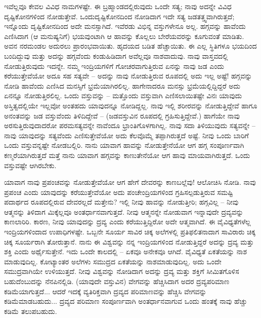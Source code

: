 ಇವೆಲ್ಲವೂ ಕೇವಲ ವಿವಿಧ ನಾಮಗಳಷ್ಟೇ. ಈ ಬ್ರಹ್ಮಾಂಡದಲ್ಲಿರುವುದು ಒಂದೇ ಸತ್ಯ; ನಾವು ಅದನ್ನೇ ವಿವಿಧ ದೃಷ್ಟಿಕೋನಗಳಿಂದ ನೋಡುತ್ತೇವೆ. ಒಂದು\break ದೃಷ್ಟಿಕೋನದಿಂದ ನೋಡಿದಾಗ ಇದೇ ಸತ್ಯ ಜಡತತ್ತ್ವವಾಗಿರುತ್ತದೆ; ಇನ್ನೊಂದು ದೃಷ್ಟಿಕೋನದಿಂದ ಅದೇ ಮನಸ್ಸಾಗಿದೆ. ಇವೆರಡು ವಿಭಿನ್ನ ವಸ್ತುಗಳೇನೂ ಅಲ್ಲ. ಹಗ್ಗವನ್ನು ಹಾವೆಂದು ಎಣಿಸಿದಾಗ (ಆ ಮನುಷ್ಯನಿಗೆ) ಭಯವುಂಟಾಗಿ ಆ ಹಾವನ್ನು ಕೊಲ್ಲಲು ಬೇರೆಯವರನ್ನು ಕೂಗುವಂತೆ ಮಾಡಿತು. ಅವನ ನರಮಂಡಲ ಅದುರಲು ಪ್ರಾರಂಭವಾಯಿತು. ಹೃದಯದ ಬಡಿತ ಹೆಚ್ಚಾಯಿತು. ಈ ಎಲ್ಲ ಸ್ಥಿತಿಗಳೂ ಭಯದಿಂದ ಬಂದಿದ್ದುವು ಮತ್ತು ಅದನ್ನು ಹಗ್ಗವೆಂದು ಕಂಡುಹಿಡಿದಾಗ ಅವೆಲ್ಲವೂ ನಾಶವಾದುವು. ನಾವು ವಾಸ್ತವದಲ್ಲಿ ನೋಡುತ್ತಿರುವುದು ಇದನ್ನೇ. ನಮ್ಮ ಇಂದ್ರಿಯಗಳಿಗೆ ಗೋಚರವಾಗುತ್ತಿರುವ ಏನನ್ನು ನಾವು ಜಡ ಎಂದು ಕರೆಯುತ್ತೇವೆಯೋ ಅದೂ ಸಹ ಸತ್ಯವೇ – ಅದನ್ನು ನಾವು ನೋಡುತ್ತಿರುವ ರೂಪದಲ್ಲಿ ಅದು ಇಲ್ಲ ಅಷ್ಟೆ! ಹಗ್ಗವನ್ನು ನೋಡಿ ಹಾವೆಂದು ಎಣಿಸಿದ ಮನಸ್ಸಿಗೆ ಭ್ರಮೆಯಾಗಿರಲಿಲ್ಲ. ಹಾಗೇನಾದರೂ ಮನಸ್ಸು ಭ್ರಮೆಯಲ್ಲಿದ್ದಿದ್ದರೆ ಅದು ಏನನ್ನೂ ನೋಡುತ್ತಿರಲಿಲ್ಲ. ಒಂದು ವಸ್ತುವನ್ನು – ಮತ್ತೊಂದು ವಸ್ತುವಾಗಿ ಎಣಿಸಲಾಯಿತಷ್ಟೇ ವಿನಃ ಯಾವುದು ಅಸ್ತಿತ್ವದಲ್ಲಿಯೇ ಇಲ್ಲವೋ ಅಂತಹದು ಯಾವುದನ್ನೂ ನೋಡಿದ್ದಲ್ಲ. ನಾವು ಇಲ್ಲಿ ಶರೀರವನ್ನು ನೋಡುತ್ತಿದ್ದೇವೆ ಹಾಗೂ ಅನಂತವನ್ನು ಜಡ ವಸ್ತುವೆಂದು ತಿಳಿದಿದ್ದೇವೆ – (ಜಡವಸ್ತುವಿನ ರೂಪದಲ್ಲಿ ಗ್ರಹಿಸುತ್ತಿದ್ದೇವೆ.) ಹಾಗೆಯೇ ನಾವು ಅರಸುತ್ತಿರುವುದಾದರೋ ಪರಮಸತ್ಯವನ್ನೇ ನಾವೆಂದೂ ಭ್ರಾಂತಿಗೊಳಗಾಗಿಲ್ಲ. ನಾವು ಸದಾ ತಿಳಿಯುವುದು ಸತ್ಯವನ್ನೇ – ನಾವು ಯಾವುದನ್ನು ಸತ್ಯವೆಂದು ಎಣಿಸುತ್ತೇವೆಯೋ ಅದು ಕೆಲವೊಮ್ಮೆ ತಪ್ಪಾಗಿರುತ್ತದೆ ಅಷ್ಟೆ. ನೀವು ಒಂದು ಬಾರಿಗೆ ಒಂದು ವಸ್ತುವನ್ನಷ್ಟೇ ನೋಡಬಲ್ಲಿರಿ. ನಾನು ಯಾವಾಗ ಹಾವನ್ನು ನೋಡುತ್ತೇನೆಯೋ ಆಗ ಹಗ್ಗ ಸಂಪೂರ್ಣವಾಗಿ ಕಣ್ಮರೆಯಾಗಿರುತ್ತದೆ ಮತ್ತೆ ನಾನು ಯಾವಾಗ ಹಗ್ಗವನ್ನು ಕಾಣುತೇನೆಯೋ ಆಗ ಹಾವು ಮಾಯವಾಗಿರುತ್ತದೆ. ಒಂದು ವಸ್ತುವಷ್ಟೇ ಆಗಿರಬೇಕು.

\vskip 1.5pt

ಯಾವಾಗ ನಾವು ಪ್ರಪಂಚವನ್ನು ನೋಡುತ್ತೇವೆಯೋ ಆಗ ಹೇಗೆ ದೇವರನ್ನು ಕಾಣಬಲ್ಲೆವು! ಆಲೋಚಿಸಿ ನೋಡಿ. ನಾವು ಪ್ರಪಂಚ ಎಂದು ಯಾವುದನ್ನು ಕರೆಯುತ್ತೇವೆಯೋ ಅದು ಪಂಚೇಂದ್ರಿಯಗಳಿಂದ ಗ್ರಹಿಸಲ್ಪಡುತ್ತಿರುವ ಸಮಷ್ಟಿ ಪದಾರ್ಥದ ರೂಪದಲ್ಲಿರುವ ದೇವರಲ್ಲದೆ ಮತ್ತೇನು? ಇಲ್ಲಿ ನೀವು ಹಾವನ್ನು ನೋಡುತ್ತೀರಿ; ಹಗ್ಗವಿಲ್ಲ – ನೀವು ಆತ್ಮನನ್ನು ತಿಳಿದಾಗ ಮಿಕ್ಕೆಲ್ಲವೂ ಅಂತರ್ಧಾನವಾಗುತ್ತದೆ. ನೀವು ಆತ್ಮನನ್ನೇ ನೋಡುವಾಗ ಇನ್ನಾವುದೇ ದ್ರವ್ಯವನ್ನು ಕಾಣಲಾರಿರಿ. ಕಾರಣ, ನೀವು ಯಾವುದನ್ನು ದ್ರವ್ಯ ಎಂದು ಕರೆಯುತ್ತಿದ್ದಿರೋ ಅದೇ ಆತ್ಮವಾಗಿದೆ. ಈ ವೈವಿಧ್ಯತೆಗಳೆಲ್ಲ ಇಂದ್ರಿಯಗಳಿಂದಾದ ಉಪಾಧಿಗಳಷ್ಟೇ. ಒಬ್ಬನೇ ಸೂರ್ಯ ಸಾವಿರ ಚಿಕ್ಕ ಅಲೆಗಳಲ್ಲಿ ಪ್ರತಿಫಲಿತನಾದಾಗ ಸಾವಿರಾರು ಚಿಕ್ಕ ಚಿಕ್ಕ ಸೂರ್ಯರಾಗಿ ತೋರುತ್ತಾನೆ. ನಾನು ಈ ವಿಶ್ವವನ್ನು ನನ್ನ ಇಂದ್ರಿಯಗಳಿಂದ ನೋಡುತ್ತಿದ್ದರೆ ಅದನ್ನು ದ್ರವ್ಯ ಮತ್ತು ಶಕ್ತಿ ಎಂದು ಅರ್ಥೈಸುತ್ತೇನೆ. ಇದು ಒಂದೇ ಕಾಲದಲ್ಲಿ – ಏಕವೂ ಅನೇಕವೂ ಆಗಿದೆ. ವೈವಿಧ್ಯತೆ ಏಕತೆಯನ್ನು ನಾಶ ಮಾಡುವುದಿಲ್ಲ. ಕೋಟ್ಯಾಂತರ ಅಲೆಗಳು ಸಮುದ್ರದ ಏಕತೆಯನ್ನು ನಾಶಮಾಡುವುದಿಲ್ಲ. ಅದು ಒಂದೇ ಸಮುದ್ರವಾಗಿಯೇ ಉಳಿಯುತ್ತದೆ. ನೀವು ವಿಶ್ವವನ್ನು ನೋಡಿದಾಗ ಅದನ್ನು ದ್ರವ್ಯ ಮತ್ತು ಶಕ್ತಿಗೆ ಸೀಮಿತಗೊಳಿಸ ಬಹುದೆಂಬುದನ್ನು ನೆನಪಿನಲ್ಲಿಡಿ. (ಯಾವುದೇ ವಸ್ತುವಿನ) ವೇಗವನ್ನು ಹೆಚ್ಚಿಸಿದಾಗ ಅದರ ದ್ರವ್ಯ\break ಪರಿಮಾಣ ಕಡಿಮೆಯಾಗುತ್ತದೆ... ಆದರೆ ಇದಕ್ಕೆ ವ್ಯತಿರಿಕ್ತವಾಗಿ ದ್ರವ್ಯದ ಪರಿಮಾಣವನ್ನು ಹೆಚ್ಚಿಸಿ ವೇಗವನ್ನು ಕಡಿಮೆಮಾಡಬಹುದು... ದ್ರವ್ಯದ ಪರಿಮಾಣ ಸಂಪೂರ್ಣವಾಗಿ ಅಂತರ್ಧಾನವಾಗುವ ಒಂದು ಹಂತಕ್ಕೆ ನಾವು ಹೆಚ್ಚು ಕಡಿಮೆ ತಲುಪಬಹುದು.

